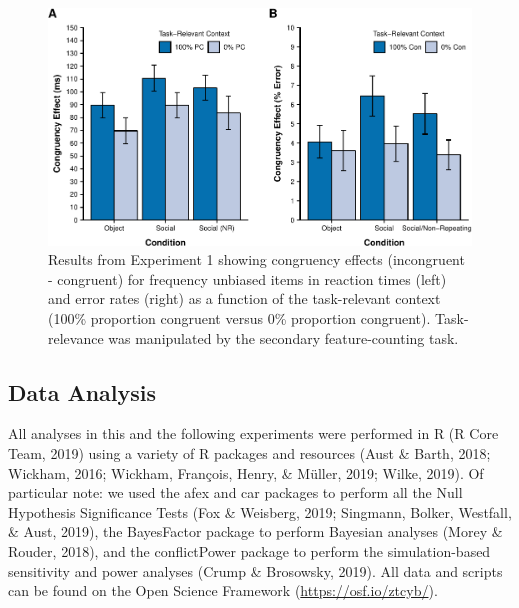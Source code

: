 \documentclass[english,,man,floatsintext]{apa6}
\begin{document}
\begin{figure}
\centering
\includegraphics{manuscript_pretty_files/figure-latex/figure2-1.pdf}
\caption{\label{fig:figure2}Results from Experiment 1 showing congruency effects (incongruent - congruent) for frequency unbiased items in reaction times (left) and error rates (right) as a function of the task-relevant context (100\% proportion congruent versus 0\% proportion congruent). Task-relevance was manipulated by the secondary feature-counting task.}
\end{figure}



\hypertarget{data-analysis}{%
\subsection{Data Analysis}\label{data-analysis}}

All analyses in this and the following experiments were performed in R (R Core Team, 2019) using a variety of R packages and resources (Aust \& Barth, 2018; Wickham, 2016; Wickham, François, Henry, \& Müller, 2019; Wilke, 2019). Of particular note: we used the afex and car packages to perform all the Null Hypothesis Significance Tests (Fox \& Weisberg, 2019; Singmann, Bolker, Westfall, \& Aust, 2019), the BayesFactor package to perform Bayesian analyses (Morey \& Rouder, 2018), and the conflictPower package to perform the simulation-based sensitivity and power analyses (Crump \& Brosowsky, 2019). All data and scripts can be found on the Open Science Framework (\url{https://osf.io/ztcyb/}).
\end{document}
